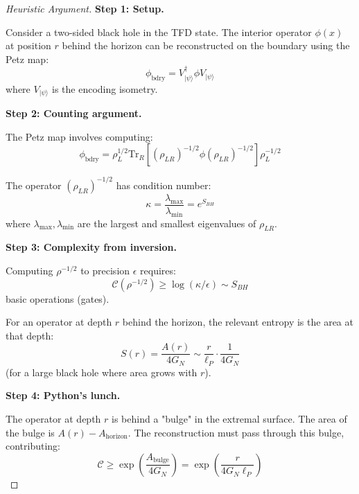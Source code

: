 \documentclass[12pt,a4paper]{article}
\begin{document}
\begin{proof}[Heuristic Argument]
\textbf{Step 1: Setup.}

Consider a two-sided black hole in the TFD state. The interior operator $\phi(x)$ at position $r$ behind the horizon can be reconstructed on the boundary using the Petz map:
\begin{equation}
\phi_{\text{bdry}} = V_{|\psi\rangle}^\dagger \phi V_{|\psi\rangle}
\end{equation}
where $V_{|\psi\rangle}$ is the encoding isometry.

\textbf{Step 2: Counting argument.}

The Petz map involves computing:
\begin{equation}
\phi_{\text{bdry}} = \rho_L^{1/2} \text{Tr}_R\left[ (\rho_{LR})^{-1/2} \phi (\rho_{LR})^{-1/2} \right] \rho_L^{-1/2}
\end{equation}

The operator $(\rho_{LR})^{-1/2}$ has condition number:
\begin{equation}
\kappa = \frac{\lambda_{\max}}{\lambda_{\min}} = e^{S_{BH}}
\end{equation}
where $\lambda_{\max}, \lambda_{\min}$ are the largest and smallest eigenvalues of $\rho_{LR}$.

\textbf{Step 3: Complexity from inversion.}

Computing $\rho^{-1/2}$ to precision $\epsilon$ requires:
\begin{equation}
\mathcal{C}(\rho^{-1/2}) \geq \log(\kappa/\epsilon) \sim S_{BH}
\end{equation}
basic operations (gates).

For an operator at depth $r$ behind the horizon, the relevant entropy is the area at that depth:
\begin{equation}
S(r) = \frac{A(r)}{4G_N} \sim \frac{r}{\ell_P} \cdot \frac{1}{4G_N}
\end{equation}
(for a large black hole where area grows with $r$).

\textbf{Step 4: Python's lunch.}

The operator at depth $r$ is behind a "bulge" in the extremal surface. The area of the bulge is $A(r) - A_{\text{horizon}}$. The reconstruction must pass through this bulge, contributing:
\begin{equation}
\mathcal{C} \geq \exp\left( \frac{A_{\text{bulge}}}{4G_N} \right) = \exp\left( \frac{r}{4G_N \ell_P} \right)
\end{equation}


\end{proof}
\end{document}
